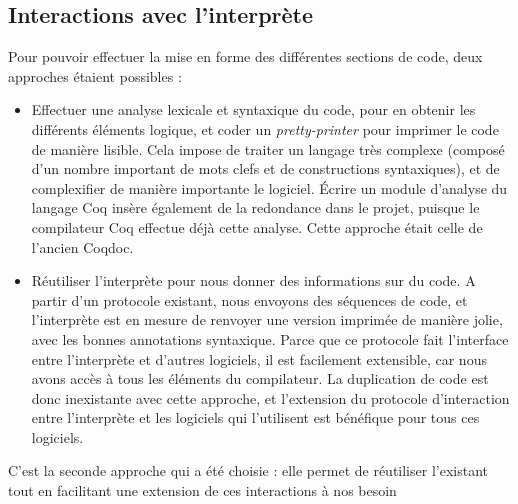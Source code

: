 \documentclass[a4paper, 11pt]{report}
\begin{document}
    \subsection{Interactions avec l'interprète}
    Pour pouvoir effectuer la mise en forme des différentes sections de code,
    deux approches étaient possibles :
      \begin{itemize}
        \item Effectuer une analyse lexicale et syntaxique du code, pour
          en obtenir les différents éléments logique, et coder un
          \textit{pretty-printer} pour imprimer le code de manière lisible.
          Cela impose de traiter un langage très complexe (composé d'un nombre
          important de mots clefs et de constructions syntaxiques), et de
          complexifier de manière importante le logiciel. Écrire un module
          d'analyse du langage Coq insère également de la redondance dans le
          projet, puisque le compilateur Coq effectue déjà cette analyse. Cette
          approche était celle de l'ancien Coqdoc.
        \item Réutiliser l'interprète pour nous donner des informations sur
          du code. A partir d'un protocole existant, nous envoyons des séquences
          de code, et l'interprète est en mesure de renvoyer une version imprimée
          de manière jolie, avec les bonnes annotations syntaxique.
          Parce que ce protocole fait l'interface entre l'interprète et d'autres
          logiciels, il est facilement extensible, car nous avons accès à tous
          les éléments du compilateur. La duplication de code est donc inexistante
          avec cette approche, et l'extension du protocole d'interaction entre
          l'interprète et les logiciels qui l'utilisent est bénéfique pour tous
          ces logiciels.
      \end{itemize}
    C'est la seconde approche qui a été choisie : elle permet de réutiliser
    l'existant tout en facilitant une extension de ces interactions à nos besoin
\end{document}
